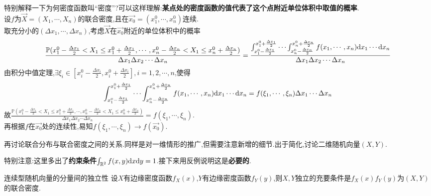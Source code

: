 特别解释一下为何密度函数叫“密度”?可以这样理解:\textbf{某点处的密度函数的值代表了这个点附近单位体积中取值的概率}.\\
设$f$为$\overrightarrow{X}=(X_1,\cdots,X_n)$的联合密度,且在$\overrightarrow{x_0}=(x_1^0,\cdots,x_n^0)$连续.\\
取充分小的$(\Delta x_1,\cdots,\Delta x_n)$,考虑$\overrightarrow{X}$在$\overrightarrow{x_0}$附近的单位体积中的概率
$$\frac{\mathbb{P}(x^0_1-\frac{\Delta x_1}{2}<X_1\leq x^0_1+\frac{\Delta x_1}{2},\cdots,x^0_n-\frac{\Delta x_n}{2}<X_1\leq x^0_n+\frac{\Delta x_n}{2})}{\Delta x_1\Delta x_2\cdots\Delta x_n}
=\frac{\int_{x_1^0-\frac{\Delta x_1}{2}}^{x_1^0+\frac{\Delta x_1}{2}}\cdots\int_{x_n^0-\frac{\Delta x_n}{2}}^{x_n^0+\frac{\Delta x_n}{2}}f(x_1,\cdots,x_n){\rm d}x_1\cdots{\rm d}x_n}{\Delta x_1\Delta x_2\cdots\Delta x_n}$$
由积分中值定理,$\exists \xi_i\in \left[x_i^0-\frac{\Delta x_i}{2},x_i^0+\frac{\Delta x_i}{2}\right],i=1,2,\cdots,n$,使得
$$\int_{x_1^0-\frac{\Delta x_1}{2}}^{x_1^0+\frac{\Delta x_1}{2}}\cdots\int_{x_n^0-\frac{\Delta x_n}{2}}^{x_n^0+\frac{\Delta x_n}{2}}f(x_1,\cdots,x_n){\rm d}x_1\cdots{\rm d}x_n=f(\xi_1,\cdots,\xi_n)\Delta x_1\cdots\Delta x_n$$
故$\frac{\mathbb{P}(x^0_1-\frac{\Delta x_1}{2}<X_1\leq x^0_1+\frac{\Delta x_1}{2},\cdots,x^0_n-\frac{\Delta x_n}{2}<X_1\leq x^0_n+\frac{\Delta x_n}{2})}{\Delta x_1\Delta x_2\cdots\Delta x_n}=f(\xi_1,\cdots,\xi_n)$.
\\再根据$f$在$\overrightarrow{x_0}$处的连续性,易知$f(\xi_1,\cdots,\xi_n)\to f(\overrightarrow{x_0})$.

再讨论联合分布与联合密度之间的关系.同样是对一维情形的推广,但需要注意新增的细节.出于简化,讨论二维随机向量$(X,Y)$.

特别注意:这里多出了\textbf{约束条件}$\int_{\mathbb{R}^2}f(x,y){\rm d}x{\rm d}y=1$.接下来用反例说明这是\textbf{必要的}.

\begin{example}
\end{example}

\begin{theorem}{连续型随机向量的分量间的独立性}{}
    设$X$有边缘密度函数$f_X(x)$,$Y$有边缘密度函数$f_Y(y)$,则$X,Y$独立的充要条件是$f_X(x)f_Y(y)$为$(X,Y)$的联合密度.
\end{theorem}


